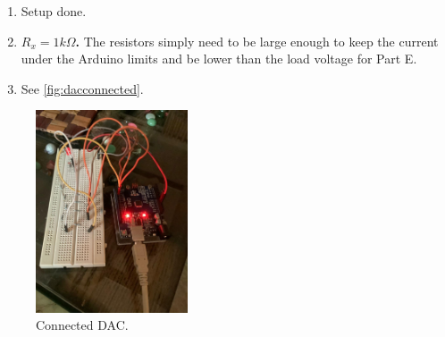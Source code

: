 
\begin{enumerate}
    \item Setup done.
    \item \textbf{$R_x = 1k \Omega$.} The resistors simply need to be large enough
            to keep the current under the Arduino limits and be lower than the 
            load voltage for Part E.
    \item See \autoref{fig:dacconnected}.
\end{enumerate}

\begin{figure}[ht]
    \centering
    \includegraphics[width=0.4\textwidth]{fig/arduinoconnected-min.jpg}
    \caption{Connected DAC.}
    \label{fig:dacconnected}
\end{figure}